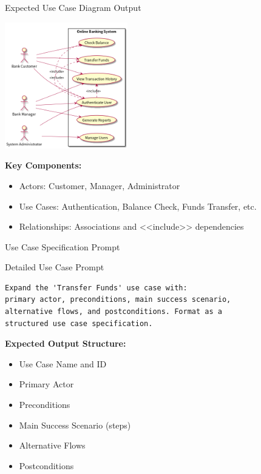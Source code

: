 \documentclass{beamer}
\begin{document}
\begin{frame}{Expected Use Case Diagram Output}
    \begin{center}
        \includegraphics[width=0.4\textwidth]{images/uc.png} %
    \end{center}
    
    \textbf{Key Components:}
    \begin{itemize}
        \item Actors: Customer, Manager, Administrator
        \item Use Cases: Authentication, Balance Check, Funds Transfer, etc.
        \item Relationships: Associations and <<include>> dependencies
    \end{itemize}
\end{frame}

\begin{frame}[fragile]{Use Case Specification Prompt}
    \begin{block}{Detailed Use Case Prompt}
        \lstset{style=code}
        \begin{lstlisting}
Expand the 'Transfer Funds' use case with: 
primary actor, preconditions, main success scenario, 
alternative flows, and postconditions. Format as a 
structured use case specification.
        \end{lstlisting}
    \end{block}
    
    \textbf{Expected Output Structure:}
    \begin{itemize}
        \item Use Case Name and ID
        \item Primary Actor
        \item Preconditions
        \item Main Success Scenario (steps)
        \item Alternative Flows
        \item Postconditions
    \end{itemize}
\end{frame}
\end{document}
